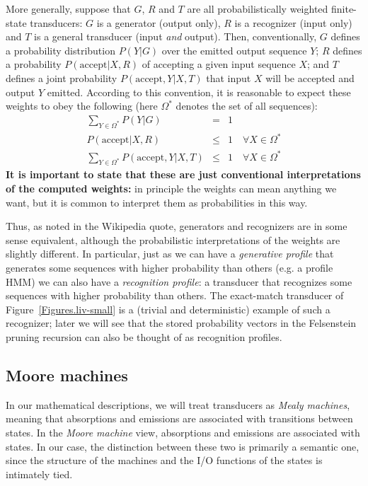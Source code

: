\documentclass{article}
\newcommand{\figref}[1]{Figure~\ref{Figures.#1}}
\begin{document}
More generally, suppose that $G$, $R$ and $T$ are all probabilistically weighted finite-state transducers:
$G$ is a generator (output only), $R$ is a recognizer (input only) and $T$ is a general transducer (input {\em and} output).
Then, conventionally, $G$ defines a probability distribution $P(Y|G)$ over the emitted output sequence $Y$;
$R$ defines a probability $P(\mbox{accept}|X,R)$ of accepting a given input sequence $X$;
and $T$ defines a joint probability $P(\mbox{accept},Y|X,T)$
that input $X$ will be accepted and output $Y$ emitted.
According to this convention, it is reasonable to expect these weights to obey the following
(here $\Omega^\ast$ denotes the set of all sequences):
\begin{eqnarray*}
\sum_{Y \in \Omega^\ast} P(Y|G) & = & 1 \\
P(\mbox{accept}|X,R) & \leq & 1 \quad \forall X \in \Omega^\ast \\
\sum_{Y \in \Omega^\ast} P(\mbox{accept},Y|X,T) & \leq & 1 \quad \forall X \in \Omega^\ast
\end{eqnarray*}
{\bf It is important to state that these are just conventional interpretations of the computed weights:}
in principle the weights can mean anything we want,
but it is common to interpret them as probabilities in this way.

Thus, as noted in the Wikipedia quote, generators and recognizers are in some sense equivalent,
although the probabilistic interpretations of the weights are slightly different.
In particular, just as we can have a {\em generative profile}
that generates some sequences with higher probability than others (e.g. a profile HMM)
we can also have a {\em recognition profile}: a transducer
that recognizes some sequences with higher probability than others.
The exact-match transducer of \figref{liv-small} is a (trivial and deterministic) example of such a recognizer;
later we will see that the stored probability vectors in the Felsenstein pruning recursion can also
be thought of as recognition profiles.

\subsection{Moore machines}

In our mathematical descriptions, we will treat transducers as
{\em Mealy machines}, meaning that absorptions and emissions are associated with transitions between states.  
In the {\em Moore machine} view, absorptions and emissions are associated with states.  
In our case, the distinction between these two is primarily a semantic one, since the structure 
of the machines and the I/O functions of the states is intimately tied.
\end{document}
